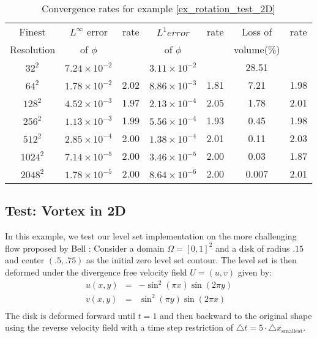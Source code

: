 \documentclass[english]{article}
\begin{document}
\begin{table}
\begin{center}
\begin{tabular}{|c|c|c|c|c|c|c|}
\hline
Finest &$L^\infty$ error&rate&$L^1 error$&rate&Loss of&rate \\
Resolution& of $\phi$      &    & of $\phi$ &    &volume(\%)&    \\\hline
$32^2$&$7.24\times10^{-2}$&    &$3.11\times10^{-2}$&    &28.51&  \\\hline
$64^2$&$1.78\times10^{-2}$&2.02&$8.86\times10^{-3}$&1.81&7.21 & 1.98   \\\hline
$128^2$&$4.52\times10^{-3}$&1.97&$2.13\times10^{-4}$&2.05&1.78& 2.01   \\\hline
$256^2$&$1.13\times10^{-3}$&1.99&$5.56\times10^{-4}$&1.93&0.45& 1.98   \\\hline
$512^2$&$2.85\times10^{-4}$&2.00&$1.38\times10^{-4}$&2.01&0.11& 2.03   \\\hline
$1024^2$&$7.14\times10^{-5}$&2.00&$3.46\times10^{-5}$&2.00&0.03& 1.87   \\\hline
$2048^2$&$1.78\times10^{-5}$&2.00&$8.64\times10^{-6}$&2.00&0.007& 2.01   \\\hline
\end{tabular}
\end{center}
\caption{Convergence rates for example \ref{ex_rotation_test_2D}
\label{tab_ex_rotation_test_2D}}
\end{table}

\subsection{Test: Vortex in 2D \label{ex_large_deformation_test_2D}}
In this example, we test our level set implementation on the more
challenging flow proposed by Bell \etal \cite{Bell_Colella_Glaz}: Consider
a domain $\Omega=[0, 1]^2$ and a disk of radius $.15$ and center $(.5,
.75)$ as the initial zero level set contour. The level set is then deformed
under the divergence free velocity field $U=(u,v)$ given by:
$$
\begin{array}{rcr}
u(x,y) &=& -\sin^2(\pi x)\sin(2\pi y) \\
v(x,y) &=&  \sin^2(\pi y)\sin(2\pi x) \\
\end{array}
$$
The disk is deformed forward until $t=1$ and then backward to the original
shape using the reverse velocity field with a time step restriction of
$\triangle t=5\cdot\triangle x_{\text{smallest}}$.
\end{document}
